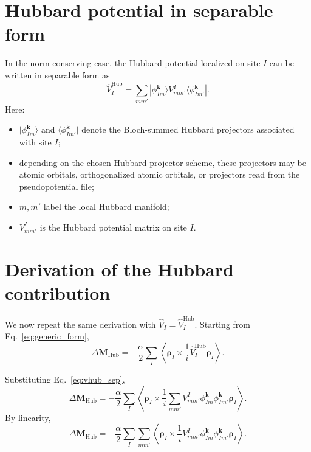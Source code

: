 \documentclass[11pt]{article}
\begin{document}
\section{Hubbard potential in separable form}

In the norm-conserving case, the Hubbard potential localized on site $I$
can be written in separable form as
\begin{equation}
\hat V_I^{\mathrm{Hub}}
=
\sum_{mm'}
|\phi_{Im}^{\mathbf{k}}\rangle
V_{mm'}^I
\langle \phi_{Im'}^{\mathbf{k}}| .
\label{eq:vhub_sep}
\end{equation}
Here:
\begin{itemize}
\item $|\phi_{Im}^{\mathbf{k}}\rangle$ and
$\langle \phi_{Im'}^{\mathbf{k}}|$ denote the Bloch-summed Hubbard
projectors associated with site $I$;
\item depending on the chosen Hubbard-projector scheme, these projectors
may be atomic orbitals, orthogonalized atomic orbitals, or projectors
read from the pseudopotential file;
\item $m,m'$ label the local Hubbard manifold;
\item $V_{mm'}^I$ is the Hubbard potential matrix on site $I$.
\end{itemize}

\section{Derivation of the Hubbard contribution}
\label{sec:hubmagnetization}

We now repeat the same derivation with $\hat V_I = \hat V_I^{\mathrm{Hub}}$. Starting from Eq.~\eqref{eq:generic_form},
\begin{equation}
\Delta \mathbf{M}_{\mathrm{Hub}}
=
-\frac{\alpha}{2}
\sum_I
\left\langle
\bm{\rho}_I \times \frac{1}{i}\hat V_I^{\mathrm{Hub}} \bm{\rho}_I
\right\rangle .
\label{eq:hub_start}
\end{equation}

Substituting Eq.~\eqref{eq:vhub_sep},
\begin{equation}
\Delta \mathbf{M}_{\mathrm{Hub}}
=
-\frac{\alpha}{2}
\sum_I
\left\langle
\bm{\rho}_I \times \frac{1}{i}
\sum_{mm'}
V_{mm'}^I
{\phi_{Im}^{\mathbf{k}}}{\phi_{Im'}^{\mathbf{k}}}
\bm{\rho}_I
\right\rangle .
\end{equation}
By linearity,
\begin{equation}
\Delta \mathbf{M}_{\mathrm{Hub}}
=
-\frac{\alpha}{2}
\sum_I \sum_{mm'}
\left\langle
\bm{\rho}_I \times \frac{1}{i}
V_{mm'}^I
{\phi_{Im}^{\mathbf{k}}}{\phi_{Im'}^{\mathbf{k}}}
\bm{\rho}_I
\right\rangle .
\end{equation}
\end{document}
